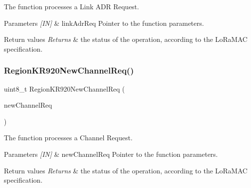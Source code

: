 The function processes a Link A\+DR Request. 


\begin{DoxyParams}{Parameters}
{\em \mbox{[}\+I\+N\mbox{]}} & link\+Adr\+Req Pointer to the function parameters.\\
\hline
\end{DoxyParams}

\begin{DoxyRetVals}{Return values}
{\em Returns} & the status of the operation, according to the Lo\+Ra\+M\+AC specification. \\
\hline
\end{DoxyRetVals}
\mbox{\label{group__REGIONKR920_gab6853b28eeb36ffabfe8c7c77bcd305d}} 
\subsubsection{\texorpdfstring{Region\+K\+R920\+New\+Channel\+Req()}{RegionKR920NewChannelReq()}}
{\footnotesize\ttfamily uint8\+\_\+t Region\+K\+R920\+New\+Channel\+Req (\begin{DoxyParamCaption}\item[{\hyperlink{group__REGION_gae2abcdb6dbb843c9faf5fd3009eca9d6}{New\+Channel\+Req\+Params\+\_\+t} $\ast$}]{new\+Channel\+Req }\end{DoxyParamCaption})}



The function processes a Channel Request. 


\begin{DoxyParams}{Parameters}
{\em \mbox{[}\+I\+N\mbox{]}} & new\+Channel\+Req Pointer to the function parameters.\\
\hline
\end{DoxyParams}

\begin{DoxyRetVals}{Return values}
{\em Returns} & the status of the operation, according to the Lo\+Ra\+M\+AC specification. \\
\hline
\end{DoxyRetVals}
\mbox{\label{group__REGIONKR920_gac4409d22f60a4e0027cc22a4079637dc}} 
